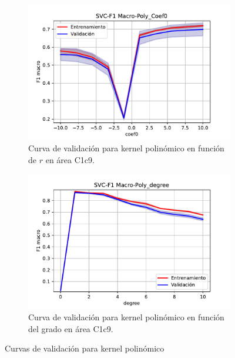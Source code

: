 \begin{figure}[H]
	\captionsetup{justification=centering}
	\centering
	\begin{subfigure}[b]{.45\linewidth}
		\includegraphics[width=\linewidth]{imagenes/resultados/svm/curvas_validacion/SVC-F1 Macro-Poly_Coef0.pdf}
		\caption{Curva de validación para kernel polinómico en función de $r$ en área C1c9.}
		\label{res:svc_vc_poly_coef0}
	\end{subfigure}
	\begin{subfigure}[b]{.45\linewidth}
		\includegraphics[width=\linewidth]{imagenes/resultados/svm/curvas_validacion/SVC-F1 Macro-Poly_degree.pdf}
		\caption{Curva de validación para kernel polinómico en función del grado en área C1c9.}
		\label{res:svc_vc_poly_degree}
	\end{subfigure}
	\caption{Curvas de validación para kernel polinómico}
	\label{res:svc_vc_poly_kernel}
\end{figure}

